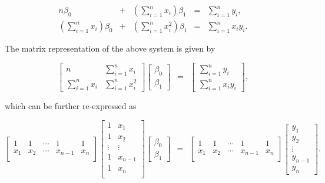 \documentclass[
]{book}
\begin{document}
\[
\begin{array}{rclcl}
n\beta_0 & + & (\sum_{i=1}^n x_i)\beta_1 & = & \sum_{i=1}^n y_i, \\
(\sum_{i=1}^nx_i)\beta_0 &  + &(\sum_{i=1}^nx_i^2)\beta_1& = &\sum_{i=1}^n x_iy_i.
\end{array}
\]

The matrix representation of the above system is given by

\[
\left[
\begin{array}{cc}
 n               & \sum_{i=1}^n x_i \\
 \sum_{i=1}^nx_i & \sum_{i=1}^nx_i^2
\end{array}
\right]
\left[
\begin{array}{c}
\beta_0 \\
\beta_1
\end{array}
\right]
~~=~~
\left[
\begin{array}{c}
\sum_{i=1}^n y_i \\
\sum_{i=1}^n x_iy_i
\end{array}
\right],
\]

which can be further re-expressed as

\[
\left[
\begin{array}{cccccc}
 1 & 1 &\cdots & 1 & 1 \\
 x_1 & x_2 & \cdots & x_{n-1} & x_n \\
\end{array}
\right]
\left[
\begin{array}{cc}
 1 & x_1 \\
 1 & x_2 \\
 \vdots & \vdots \\
 1 & x_{n-1}\\
 1 & x_n \\
\end{array}
\right]
\left[
\begin{array}{c}
\beta_0 \\
\beta_1
\end{array}
\right]
~~=~~
\left[
\begin{array}{cccccc}
 1 & 1 &\cdots & 1 & 1 \\
 x_1 & x_2 & \cdots & x_{n-1} & x_n \\
\end{array}
\right]
\left[
\begin{array}{c}
y_1 \\
y_2\\
\vdots\\
y_{n-1}\\
y_n
\end{array}
\right].
\]
\end{document}

